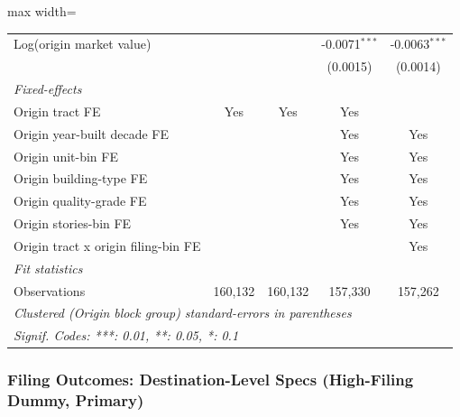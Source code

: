 \documentclass[
  11pt,
]{article}
\begin{document}
\begin{adjustbox}{max width=\textwidth}
\begin{tabular}{lcccc}
   Log(origin market value)                       &                &                & -0.0071$^{***}$ & -0.0063$^{***}$\\   
                                                  &                &                & (0.0015)        & (0.0014)\\   
   \midrule
   \emph{Fixed-effects}\\
   Origin tract FE                                & Yes            & Yes            & Yes             & \\  
   Origin year-built decade FE                    &                &                & Yes             & Yes\\  
   Origin unit-bin FE                             &                &                & Yes             & Yes\\  
   Origin building-type FE                        &                &                & Yes             & Yes\\  
   Origin quality-grade FE                        &                &                & Yes             & Yes\\  
   Origin stories-bin FE                          &                &                & Yes             & Yes\\  
   Origin tract x origin filing-bin FE            &                &                &                 & Yes\\  
   \midrule
   \emph{Fit statistics}\\
   Observations                                   & 160,132        & 160,132        & 157,330         & 157,262\\  
   \midrule \midrule
   \multicolumn{5}{l}{\emph{Clustered (Origin block group) standard-errors in parentheses}}\\
   \multicolumn{5}{l}{\emph{Signif. Codes: ***: 0.01, **: 0.05, *: 0.1}}\\
\end{tabular}
\par\endgroup

\end{adjustbox}

\subsubsection{Filing Outcomes: Destination-Level Specs (High-Filing
Dummy,
Primary)}\label{filing-outcomes-destination-level-specs-high-filing-dummy-primary}
\end{document}
